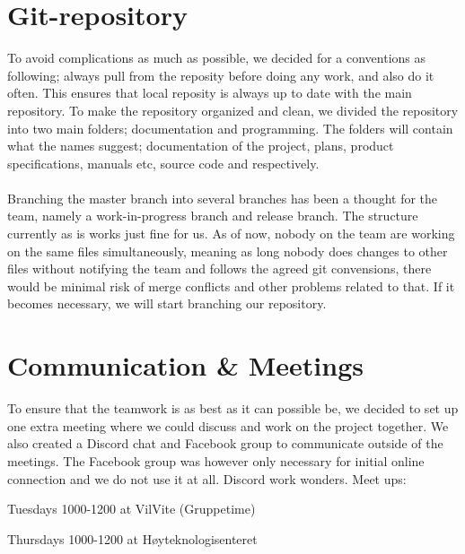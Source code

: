\documentclass{article}
\begin{document}
\section*{Git-repository}
To avoid complications as much as possible, we decided for a conventions as following; always pull from the reposity before doing any work, and also do it often. This ensures that local reposity is always up to date with the main repository. To make the repository organized and clean, we divided the repository into two main folders; documentation and programming. The folders will contain what the names suggest; documentation of the project, plans, product specifications, manuals etc, source code and respectively.\\\\
Branching the master branch into several branches has been a thought for the team, namely a work-in-progress branch and release branch. The structure currently as is works just fine for us. As of now, nobody on the team are working on the same files simultaneously, meaning as long nobody does changes to other files without notifying the team and follows the agreed git convensions, there would be minimal risk of merge conflicts and other problems related to that. If it becomes necessary, we will start branching our repository.

\section*{Communication \& Meetings}
To ensure that the teamwork is as best as it can possible be, we decided to set up one extra meeting where we could discuss and work on the project together. We also created a Discord chat and Facebook group to communicate outside of the meetings. The Facebook group was however only necessary for initial online connection and we do not use it at all. Discord work wonders.
Meet ups:
			\begin{list}{-}{}
				\item Tuesdays 1000-1200 at VilVite (Gruppetime) 
				\item Thursdays 1000-1200 at Høyteknologisenteret
			\end{list}
\end{document}
